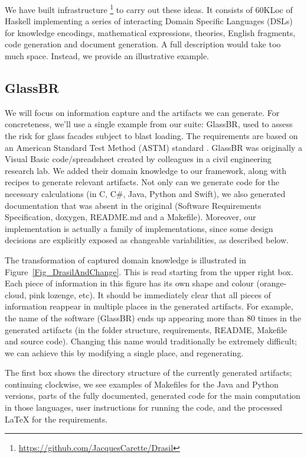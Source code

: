 \documentclass[a4paper,UKenglish,cleveref,autoref,thm-restate]{oasics-v2021}
\newcommand{\CC}{C\nolinebreak\hspace{-.05em}\raisebox{.4ex}{\small\bf +}\nolinebreak\hspace{-.10em}\raisebox{.4ex}{\small\bf +}}
\begin{document}
We have built infrastructure%
\footnote{\url{https://github.com/JacquesCarette/Drasil}} 
to carry out these ideas. It consists of 60KLoc of Haskell
implementing a series of interacting Domain Specific Languages (DSLs) for
knowledge encodings, mathematical expressions, theories, English fragments,
code generation and document generation.  A full description would take too
much space.  Instead, we provide an illustrative example.

\subsection{GlassBR}
We will focus on information capture and the artifacts we can generate. For
concreteness, we'll use a single example from our suite: GlassBR, used to assess
the risk for glass facades subject to blast loading. The requirements are based
on an American Standard Test Method (ASTM) standard \cite{ASTM2009, ASTM2015,
BeasonEtAl1998}. GlassBR was originally a Visual Basic code/spreadsheet
created by colleagues in a civil engineering research lab.  We added their
domain knowledge to our framework, along with recipes to generate relevant
artifacts.  Not only can we generate code for the necessary calculations (in
\CC, C\#, Java, Python and Swift), we also generated documentation that was absent in the
original (Software Requirements Specification, doxygen, README.md and a
Makefile). Moreover, our implementation is actually a family of implementations,
since some design decisions are explicitly exposed as changeable variabilities,
as described below.

The transformation of captured domain knowledge is illustrated in
Figure~\ref{Fig_DrasilAndChange}. This is read starting from the upper right
box. Each piece of information in this figure has its own shape and colour
(orange-cloud, pink lozenge, etc). It should be immediately clear that all
pieces of information reappear in multiple places in the generated artifacts.
For example, the name of the software (GlassBR) ends up appearing more than 80
times in the generated artifacts (in the folder structure, requirements, README,
Makefile and source code). Changing this name would traditionally be extremely
difficult; we can achieve this by modifying a single place, and regenerating.

The first box shows the directory structure of the currently generated
artifacts; continuing clockwise, we see examples of Makefiles for the Java and
Python versions, parts of the fully documented, generated code for the main
computation in those languages, user instructions for running the code, and the
processed \LaTeX{} for the requirements.
\end{document}
